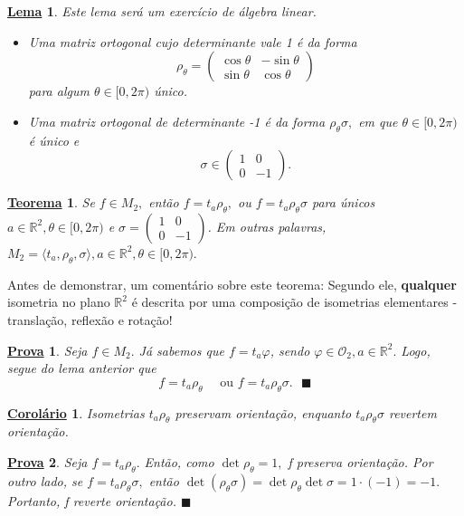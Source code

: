 \documentclass{article}
\newtheorem*{theorem*}{\underline{Teorema}}
\newtheorem*{crl*}{\underline{Corol\'ario}}
\newtheorem*{proof*}{\underline{Prova}}
\newtheorem*{lemma*}{\underline{Lema}}
\renewcommand\qedsymbol{$\blacksquare$}
\begin{document}
\begin{lemma*}
  Este lema será um exercício de álgebra linear.
 \begin{itemize}
   \item[1)] Uma matriz ortogonal cujo determinante vale 1 é da forma 
     $$
       \rho_{\theta } = \begin{pmatrix}
         \cos{\theta } & -\sin{\theta } \\
         \sin{\theta } & \cos{\theta }
       \end{pmatrix}
     $$
     para algum $\theta \in[0,2\pi )$ único.
   \item[2)] Uma matriz ortogonal de determinante -1 é da forma $\rho_{\theta }\sigma ,$ em que $\theta \in[0, 2\pi)$ é único e 
     $$
       \sigma \in \begin{pmatrix}
         1 & 0 \\
         0 & -1
       \end{pmatrix}.
     $$
 \end{itemize}
\end{lemma*}
\begin{theorem*}
  Se $f\in M_{2},$ então $f=t_{a}\rho_{\theta },$ ou $f = t_{a}\rho_{\theta }\sigma  $ para únicos $a\in \mathbb{R}^{2},\theta \in[0,2\pi)$
  e $\sigma = \begin{pmatrix}
    1 & 0\\
    0 & -1
  \end{pmatrix}$. Em outras palavras, $M_{2} = \langle t_{a}, \rho_{\theta }, \sigma \rangle, a \in \mathbb{R}^{2}, \theta \in[0,2\pi).$
\end{theorem*}
Antes de demonstrar, um comentário sobre este teorema: Segundo ele, \textbf{qualquer} isometria no plano $\mathbb{R}^{2}$ é
descrita por uma composição de isometrias elementares - translação, reflexão e rotação! 
\begin{proof*}
  Seja $f\in M_{2}.$ Já sabemos que $f = t_{a}\varphi $, sendo $\varphi \in \mathcal{O}_{2}, a\in \mathbb{R}^{2}.$ Logo, segue do lema
  anterior que 
    $$
    f = t_{a}\rho _{\theta }\quad\text{ ou } f = t_{a}\rho_{\theta }\sigma . \text{ \qedsymbol}
    $$
\end{proof*}
\begin{crl*}
  Isometrias $t_{a}\rho_{\theta }$ preservam orientação, enquanto $t_{a}\rho_{\theta }\sigma $ revertem orientação.
\end{crl*}
\begin{proof*}
  Seja $f=t_{a}\rho_{\theta }.$ Então, como $\det{\rho_{\theta }} =1,$ f preserva orientação. Por outro lado, se $f=t_{a}\rho_{\theta }\sigma ,$
  então $\det{(\rho_{\theta }\sigma )} = \det{\rho_{\theta }}\det{\sigma } = 1 \cdot (-1) = -1.$ Portanto, f reverte orientação. \qedsymbol
\end{proof*}
\end{document}
